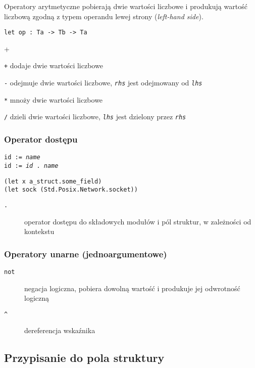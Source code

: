 Operatory arytmetyczne pobierają dwie wartości liczbowe i produkują wartość liczbową zgodną z typem operandu
lewej strony (\emph{left-hand side}).

\begin{lstlisting}
let op : Ta -> Tb -> Ta
\end{lstlisting}

\begin{labeling}{+}
    \item[\texttt{+}] dodaje dwie wartości liczbowe
    \item[\texttt{-}] odejmuje dwie wartości liczbowe, \emph{\texttt{rhs}} jest odejmowany od
        \emph{\texttt{lhs}}
    \item[\texttt{*}] mnoży dwie wartości liczbowe
    \item[\texttt{/}] dzieli dwie wartości liczbowe, \emph{\texttt{lhs}} jest dzielony przez
        \emph{\texttt{rhs}}
\end{labeling}

\subsubsection{Operator dostępu}

\texttt{id := \emph{name}} \\
\texttt{id := \emph{id} . \emph{name}}

\begin{lstlisting}
(let x a_struct.some_field)
(let sock (Std.Posix.Network.socket))
\end{lstlisting}

\begin{description}
    \item[\texttt{.}] operator dostępu do składowych modułów i pól struktur, w zależności od kontekstu
\end{description}

\subsubsection{Operatory unarne (jednoargumentowe)}

\begin{description}
    \item[\texttt{not}] negacja logiczna, pobiera dowolną wartość i produkuje jej odwrotność logiczną
    \item[\texttt{\^}] dereferencja wskaźnika
\end{description}

\subsection{Przypisanie do pola struktury}

